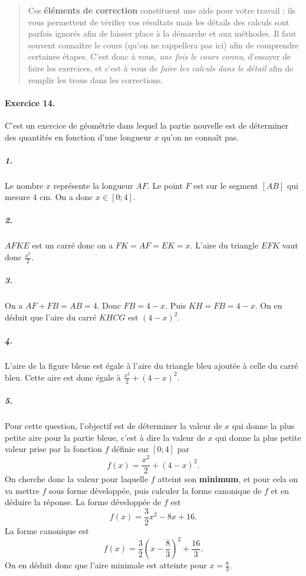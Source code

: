 \documentclass[11pt]{article}
\begin{document}
\renewcommand{\abstractname}{Avertissement -- Consignes d'utilisation}

\begin{abstract}
  Ces \textbf{éléments de correction} constituent une aide pour votre travail :
  ils vous permettent de vérifier vos résultats mais les détails des calculs
  sont parfois ignorés afin de laisser place à la démarche et aux méthodes. Il
  faut souvent connaître le cours (qu'on ne rappellera pas ici) afin de
  comprendre certaines étapes. C'est donc à vous, \emph{une fois le cours
  connu}, d'essayer de faire les exercices, et c'est à vous de \emph{faire les
  calculs dans le détail} afin de remplir les trous dans les corrections.
\end{abstract}

\paragraph{Exercice 14.}
C'est un exercice de géométrie dans lequel la partie nouvelle est de déterminer
des quantités en fonction d'une longueur $x$ qu'on ne conna\^it pas.

\subparagraph{1.}
Le nombre $x$ représente la longueur $AF$. Le point $F$ est sur le segment
$\left[ AB \right]$ qui mesure $4$ cm. On a donc $x\in\left[ 0;4 \right]$.

\subparagraph{2.}
$AFKE$ est un carré donc on a $FK=AF=EK=x$. L'aire du triangle $EFK$ vaut donc
$\frac{x^2}{2}$.

\subparagraph{3.}
On a $AF+FB=AB=4$. Donc $FB=4-x$. Puis $KH=FB=4-x$. On en déduit que l'aire du
carré $KHCG$ est $(4-x)^2$.

\subparagraph{4.}
L'aire de la figure bleue est égale à l'aire du triangle bleu ajoutée à celle du
carré bleu. Cette aire est donc égale à $\frac{x^2}{2}+(4-x)^2$.

\subparagraph{5.}
Pour cette question, l'objectif est de déterminer la valeur de $x$ qui donne la
plus petite aire pour la partie bleue, c'est à dire la valeur de $x$ qui donne
la plus petite valeur prise par la fonction $f$ définie sur $\left[ 0; 4
\right]$ par
\[
  f(x) = \frac{x^2}{2}+(4-x)^2.
\]
On cherche donc la valeur pour laquelle $f$ atteint son \textbf{minimum}, et
pour cela on va mettre $f$ sous forme développée, puis calculer la forme
canonique de $f$ et en déduire la réponse.
La forme développée de $f$ est
\[
  f(x) = \frac{3}{2}x^2-8x+16.
\]
La forme canonique est
\[
  f(x) = \frac{3}{2}\left(x-\frac{8}{3}\right)^2+\frac{16}{3}.
\]
On en déduit donc que l'aire minimale est atteinte pour $x=\frac{8}{3}$.
\end{document}
